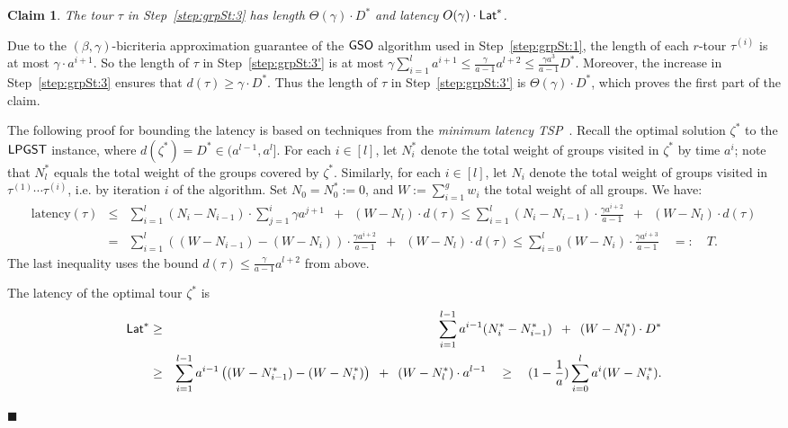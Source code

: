\documentclass[11pt]{article}
\newtheorem{claim}[thm]{Claim}
\def\lat{{\sf Lat}\xspace}
\def\lpgst{\ensuremath{{\sf LPGST}}\xspace}
\def\gso{\ensuremath{{\sf GSO}}\xspace}
\newenvironment{pf}{

\noindent{\bf Proof:}} {\hfill$\blacksquare$


}
\begin{document}
\begin{claim}\label{cl:lat-gst-1}
  The tour $\tau$ in Step~\ref{step:grpSt:3} has length
  $\Theta(\gamma)\cdot D^*$ and latency $O(\gamma)\cdot \lat^*$.
\end{claim}
\begin{pf}
Due to the $(\beta,\gamma)$-bicriteria approximation guarantee of the \gso algorithm used in Step~\ref{step:grpSt:1}, the length of each $r$-tour $\tau^{(i)}$ is at most $\gamma\cdot a^{i+1}$. So the length of  $\tau$ in Step~\ref{step:grpSt:3'} is at most $\gamma \sum_{i =1}^l a^{i+1} \le \frac{\gamma}{a-1} a^{l+2}  \le  \frac{\gamma a^3}{ a-1} D^*$.
Moreover, the increase in Step~\ref{step:grpSt:3}
  ensures that $d(\tau)\ge \gamma\cdot D^*$. Thus the length of  $\tau$ in Step~\ref{step:grpSt:3'} is $\Theta(\gamma)\cdot D^*$, which proves the first part of the claim. 
  
 
 
  The following proof for bounding the latency is based on techniques from
  the {\em minimum latency TSP}~\cite{cgrt,fhr}. Recall the optimal solution $\zeta^*$
  to the \lpgst instance, where $d(\zeta^*)=D^*\in ( a^{l-1},
   a^l]$. For each $i\in [l]$, let $N^*_i$ denote the total weight of
  groups visited in $\zeta^*$ by time $ a^i$; note that $N^*_l$
  equals the total weight of the groups covered by $\zeta^*$.
  Similarly, for each $i\in [l]$, let $N_i$ denote the total weight of
  groups visited in $\tau^{(1)}\cdots \tau^{(i)}$, i.e. by iteration $i$
  of the algorithm. Set $N_0=N^*_0:=0$, and $W:=\sum_{i=1}^g w_i$ the
  total weight of all groups. We have: 
{\small \begin{eqnarray*}
\mbox{latency}(\tau) & \le & \sum_{i=1}^l (N_i-N_{i-1})\cdot \sum_{j=1}^i \gamma a^{j+1} \,\,\, +\,\,\, (W-N_l)\cdot d(\tau) \le  \sum_{i=1}^l (N_i-N_{i-1})\cdot \frac{\gamma a^{i+2}}{ a-1} \,\,\, +\,\,\, (W-N_l)\cdot d(\tau)\\
&= &\sum_{i=1}^l \left( (W-N_{i-1}) - (W-N_i) \right)\cdot \frac{\gamma a^{i+2}}{ a-1} \,\,\, +\,\,\, (W-N_l)\cdot d(\tau) \le  \sum_{i=0}^l (W-N_i) \cdot \frac{\gamma a^{i+3}}{ a-1} \quad =:\quad T.
\end{eqnarray*}  }
  The last inequality uses the bound $d(\tau)\le \frac{\gamma}{ a-1}  a^{l+2}$ from above.
  
The latency of the optimal tour $\zeta^*$ is
\begin{eqnarray*}
\lat^* &\ge & \sum_{i=1}^{l-1}  a^{i-1}(N^*_i-N^*_{i-1})\,\,\, +\,\,\, (W-N^*_l)\cdot D^*\\
&\ge & \sum_{i=1}^{l-1}  a^{i-1}\left((W-N^*_{i-1})-(W-N^*_i)\right)\,\,\, +\,\,\, (W-N^*_l)\cdot  a^{l-1}\quad \ge \quad (1-\frac1 a)\sum_{i=0}^{l}  a^{i}(W-N^*_{i}).
\end{eqnarray*}


\end{pf}
\end{document}
